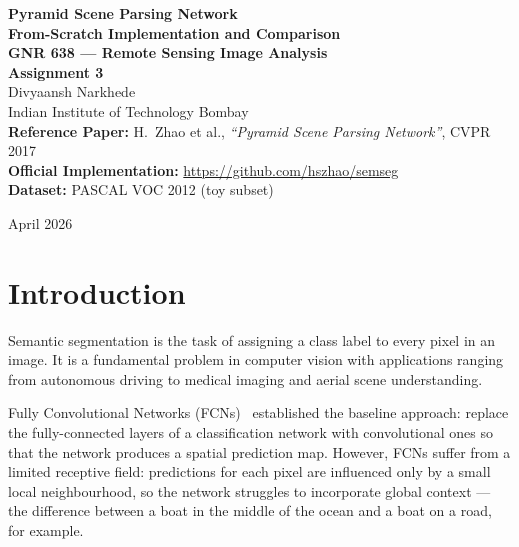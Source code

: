 \documentclass[12pt,a4paper]{article}
\begin{document}

\begin{titlepage}
    \centering
    \vspace*{2cm}

    {\Huge\bfseries Pyramid Scene Parsing Network\\[0.4em]
     \large From-Scratch Implementation and Comparison}\\[1.5cm]

    {\large\bfseries GNR 638 — Remote Sensing Image Analysis\\[0.3em]
     Assignment 3}\\[1.5cm]

    {\large Divyaansh Narkhede}\\[0.5em]
    {\normalsize Indian Institute of Technology Bombay}\\[2cm]

    {\normalsize
        \textbf{Reference Paper:} H.~Zhao et al.,
        \textit{``Pyramid Scene Parsing Network''}, CVPR 2017\\[0.3em]
        \textbf{Official Implementation:} \url{https://github.com/hszhao/semseg}\\[0.3em]
        \textbf{Dataset:} PASCAL VOC 2012 (toy subset)
    }

    \vfill
    {\normalsize April 2026}
\end{titlepage}

\tableofcontents
\newpage

\section{Introduction}

Semantic segmentation is the task of assigning a class label to every pixel
in an image.  It is a fundamental problem in computer vision with applications
ranging from autonomous driving to medical imaging and aerial scene
understanding.

Fully Convolutional Networks (FCNs)~\cite{long2015} established the baseline
approach: replace the fully-connected layers of a classification network with
convolutional ones so that the network produces a spatial prediction map.
However, FCNs suffer from a limited receptive field: predictions for each
pixel are influenced only by a small local neighbourhood, so the network
struggles to incorporate global context — the difference between a boat in the
middle of the ocean and a boat on a road, for example.
\end{document}
